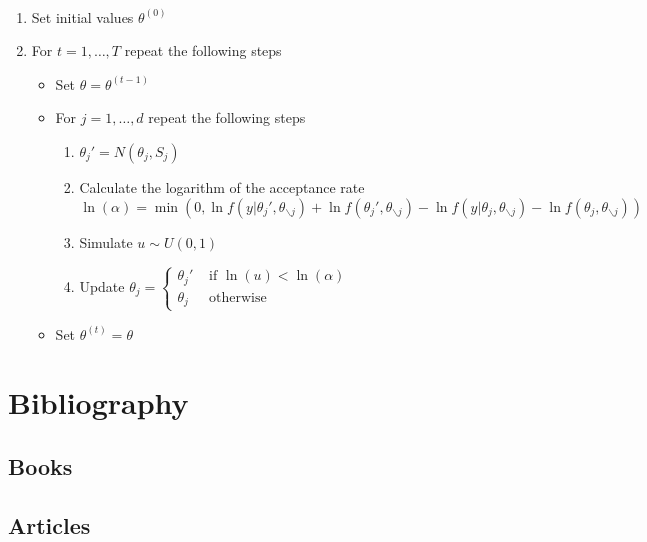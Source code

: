 \documentclass[11pt,fleqn]{book} %
\begin{document}
\begin{algorithm} \ 
\begin{enumerate}
\item Set initial values $\theta^{(0)}$
\item For $t=1,\dots,T$ repeat the following steps
\begin{itemize}
\item Set $\theta=\theta^{(t-1)}$
\item For $j=1,\dots,d$ repeat the following steps
\begin{enumerate}[label=\alph*.]
\item $\theta_j' = N(\theta_j,S_j)$
\item Calculate the logarithm of the acceptance rate \\
      $\ln(\alpha) = \min \left( 0,
          \ln f(y|\theta_j',\theta_{\backslash j}) + 
          \ln f(\theta_j',\theta_{\backslash j}) - 
          \ln f(y|\theta_j,\theta_{\backslash j}) - 
          \ln f(\theta_j,\theta_{\backslash j})
       \right)$
\item Simulate $u \sim U(0,1)$
\item Update $\theta_j=\left\{
  \begin{array}{ll}
  \theta_j' & \textrm{ if } \ln(u) < \ln(\alpha) \\
  \theta_j  & \textrm{ otherwise }
  \end{array}\right.$ 
\end{enumerate}
\item Set $\theta^{(t)}=\theta$
\end{itemize}
\end{enumerate}
\end{algorithm}



\chapter*{Bibliography}
\section*{Books}
\printbibliography[heading=bibempty,type=book]
\section*{Articles}
\printbibliography[heading=bibempty,type=article]
\end{document}
